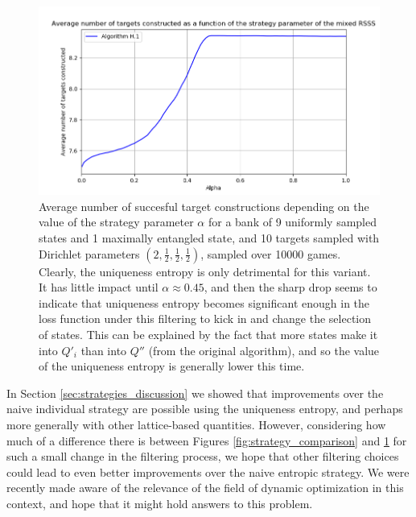 \begin{figure}[h!]
    \centering
    \includegraphics[scale=0.65]{images/locc_counter.png}
    \caption{Average number of succesful target constructions depending on the value of the strategy parameter $\alpha$ for a bank of 9 uniformly sampled states and 1 maximally entangled state, and 10 targets sampled with Dirichlet parameters $\left(2, \frac{1}{2}, \frac{1}{2}, \frac{1}{2}\right)$, sampled over 10000 games. Clearly, the uniqueness entropy is only detrimental for this variant. It has little impact until $\alpha \approx 0.45$, and then the sharp drop seems to indicate that uniqueness entropy becomes significant enough in the loss function under this filtering to kick in and change the selection of states. This can be explained by the fact that more states make it into $Q'_i$ than into $Q''$ (from the original algorithm), and so the value of the uniqueness entropy is generally lower this time.}
    \label{fig:variant_results}
\end{figure}

In Section \ref{sec:strategies_discussion} we showed that improvements over the naive individual strategy are possible using the uniqueness entropy, and perhaps more generally with other lattice-based quantities. However, considering how much of a difference there is between Figures \ref{fig:strategy_comparison} and \ref{fig:variant_results} for such a small change in the filtering process, we hope that other filtering choices could lead to even better improvements over the naive entropic strategy. We were recently made aware of the relevance of the field of dynamic optimization in this context, and hope that it might hold answers to this problem.